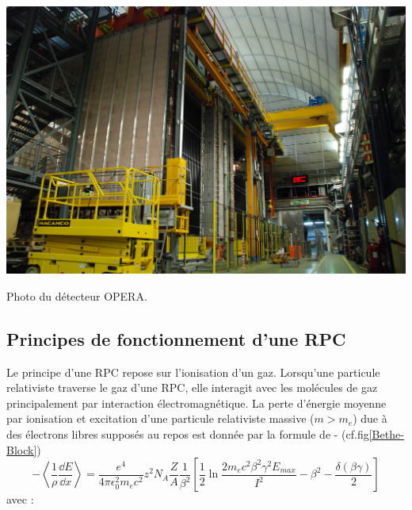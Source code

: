 \marginpar
{
	\centering
	\includegraphics[width=\marginparwidth]{RPC/OPERA.jpg}
	\captionsetup{type=subfigure}\caption{Photo du détecteur OPERA.}
	\label{opera}
}

\subsection{Principes de fonctionnement d'une RPC}
Le principe d'une RPC repose sur l'ionisation d'un gaz. Lorsqu'une particule relativiste traverse le gaz d'une RPC, elle interagit avec les molécules de gaz principalement par interaction électromagnétique. La perte d'énergie moyenne par ionisation et excitation d'une particule relativiste massive ($m>m_{e}$) due à des électrons libres supposés au repos est donnée par la formule de - (cf.fig\ref{Bethe-Block})
\begin{equation}
-\left<\frac{1}{\rho}\frac{\dd E}{\dd x}\right>=\frac{e^{4}}{4\pi \epsilon_{0}^{2}m_{e}c^{2}}z^{2}N_{A}\frac{Z}{A}\frac{1}{\beta^{2}}\left[\frac{1}{2}\ln\frac{2m_{e}c^{2}\beta^{2}\gamma^{2}E_{max}}{I^{2}}-\beta^{2}-\frac{\delta(\beta\gamma)}{2}\right]
\end{equation}
avec :


